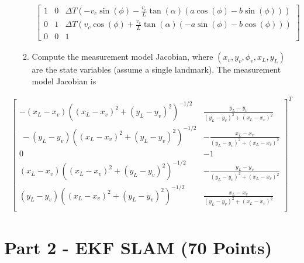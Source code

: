 \documentclass{article}
\begin{document}
\begin{enumerate}
\begin{enumerate}
\begin{align*}
    \begin{bmatrix}
     1 & 0 & \Delta T\left(-v_c\sin(\phi) -\frac{v_c}{L}\tan(\alpha) (a\cos(\phi)-b\sin(\phi)) \right)
     \\
     0 & 1 & \Delta T \left(v_c \cos(\phi) + \frac{v_c}{L}\tan(\alpha)(-a\sin(\phi) - b \cos(\phi)) \right)
     \\
     0 & 0 & 1
     \end{bmatrix}
    \end{align*}

    \item Compute the measurement model Jacobian, where $(x_v,y_v,\phi_v,x_L,y_L)$ are the state variables (assume a single landmark).
    The measurement model Jacobian is
    

\end{enumerate}


    \end{enumerate} 
    \begin{align*}
     \begin{bmatrix}
      -(x_L-x_v)\left((x_L-x_v)^2 + (y_L-y_v)^2 \right)^{-1/2} & \frac{y_L-y_v}{(y_L-y_v)^2+(x_L-x_v)^2}\\\ 
      -(y_L-y_v)\left((x_L-x_v)^2 + (y_L-y_v)^2 \right)^{-1/2} & -\frac{x_L-x_v}{(y_L-y_v)^2+(x_L-x_v)^2}\\ 
      0 & -1\\ 
      (x_L-x_v)\left((x_L-x_v)^2 + (y_L-y_v)^2 \right)^{-1/2} & -\frac{y_L-y_v}{(y_L-y_v)^2+(x_L-x_v)^2} \\ 
      (y_L-y_v)\left((x_L-x_v)^2 + (y_L-y_v)^2 \right)^{-1/2} & \frac{x_L-x_v}{(y_L-y_v)^2+(x_L-x_v)^2}
      \\
     \end{bmatrix}^T
    \end{align*}


\section{Part 2 - EKF SLAM (70 Points)}
\end{document}
